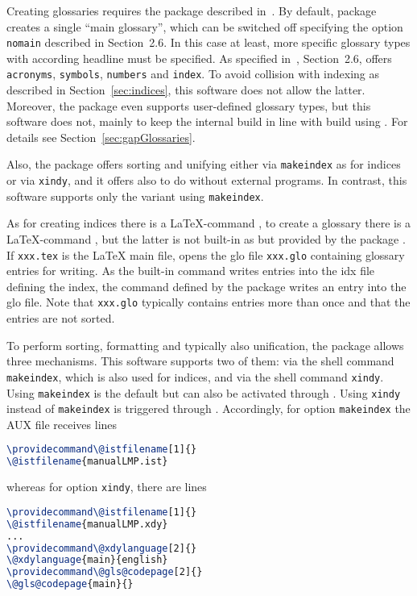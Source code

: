 Creating glossaries 
requires the package  described in~\cite{GloP4_54}. 
By default, package  creates a single ``main glossary'', 
which can be switched off specifying the option \texttt{nomain} 
described in Section~2.6. 
In this case at least, more specific glossary types with according headline must be specified. 
As specified in~\cite{GloP4_54}, Section~2.6, 
 offers \texttt{acronyms}, \texttt{symbols},
\texttt{numbers} and \texttt{index}. 
To avoid collision with indexing as described in Section~\ref{sec:indices}, 
this software does not allow the latter. 
Moreover, the package  even supports user-defined glossary types, 
but this software does not, 
mainly to keep the internal build in line with build using . 
For details see Section~\ref{sec:gapGlossaries}. 

Also, the package  offers sorting and unifying 
either via \texttt{makeindex} as for indices or via \texttt{xindy}, 
and it offers also to do without external programs. 
In contrast, this software supports only the variant using \texttt{makeindex}. 





As for creating indices there is a \LaTeX-command , 
to create a glossary there is a \LaTeX-command , 
but the latter is not built-in as  
but provided by the package . 
If \texttt{xxx.tex} is the \LaTeX{} main file, 
 opens the glo file \texttt{xxx.glo} 
containing glossary entries for writing. 
As the built-in command  
writes entries into the \gls{idx} file defining the index, 
the command  defined by the package  
writes an entry into the glo file. 
Note that \texttt{xxx.glo} typically contains entries more than once 
and that the entries are not sorted. 

To perform sorting, formatting and typically also unification, 
the package  allows three mechanisms. 
This software supports two of them: 
via the shell command \texttt{makeindex}, which is also used for indices, 
and via the shell command \texttt{xindy}. 
Using \texttt{makeindex} is the default but can also be activated through 
. 
Using \texttt{xindy} instead of \texttt{makeindex} is triggered through 
. 
Accordingly, for option \texttt{makeindex} the AUX file receives lines 
%
\begin{lstlisting}[language=TeX]
\providecommand\@istfilename[1]{}
\@istfilename{manualLMP.ist}
\end{lstlisting}
%
whereas for option \texttt{xindy}, there are lines 
%
\begin{lstlisting}[language=TeX]
\providecommand\@istfilename[1]{}
\@istfilename{manualLMP.xdy}
...
\providecommand\@xdylanguage[2]{}
\@xdylanguage{main}{english}
\providecommand\@gls@codepage[2]{}
\@gls@codepage{main}{}
\end{lstlisting}



